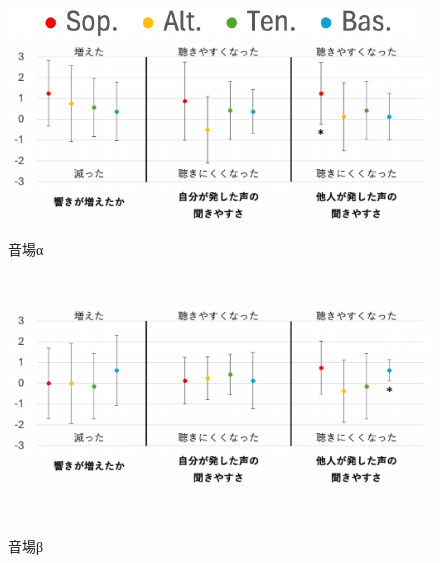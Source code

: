 \documentclass[11pt,a4j]{jreport}
\begin{document}
\newpage
\begin{figure}[H]
  \centering
  
  \begin{minipage}{1\linewidth}
    \centering
    \includegraphics[scale=.55]{images/subjectiveExp/statisticAnalysis/part_legend.pdf}
  \end{minipage}
  \vspace{.5\baselineskip}

  \begin{minipage}{1\linewidth}
    \centering
    \includegraphics[scale=.55]{images/subjectiveExp/statisticAnalysis/part_reverb_a.pdf}
    \caption*{音場α}
    \label{fig:響きの印象α}
  \end{minipage}
  \\
  \vspace{1\baselineskip}
  \begin{minipage}{1\linewidth}
    \centering
    \includegraphics[scale=.55]{images/subjectiveExp/statisticAnalysis/part_reverb_b.pdf}
    \caption*{音場β}
    \label{fig:響きの印象β}
  \end{minipage}
  \\
  \vspace{1\baselineskip}
  \begin{minipage}{1\linewidth}

\end{minipage}
\end{figure}
\end{document}
